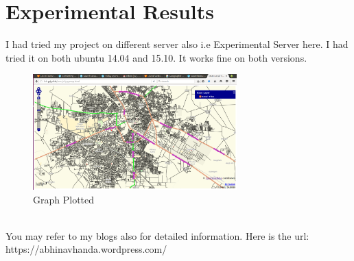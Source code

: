 
\section{Experimental Results}
I had tried my project on different server also i.e Experimental Server here. I had tried it on both ubuntu 14.04 and 15.10. It works fine on both versions.
\begin{figure}[!ht]
	\centering
	\includegraphics[width=0.7\textwidth]{input/images/exp.png}                
	\caption{Graph Plotted}
	\hspace{-1.5em}
\end{figure}\\
You may refer to my blogs also for detailed information.
Here is the url: 
https://abhinavhanda.wordpress.com/

 
 
 

